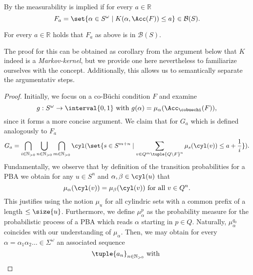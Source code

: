   By \cite[Theorem 9.2]{Bauer} the measurability is implied if for every 
  $a\in\mathbb{R}$ 
  \begin{equation*}
    F_{a} = \set{\alpha\in S^{\omega}\mid 
      K(\alpha, \Acc(F))\leq a}\in\mathcal{B}(S).
  \end{equation*}
  \begin{lemma}
    For every $a\in\mathbb{R}$ holds that $F_{a}$ as above is in 
    $\mathcal{B}(S)$.
  \end{lemma}
  The proof for this can be obtained as corollary from the argument below that 
  $K$ indeed is a \emph{Markov-kernel}, but we provide one here nevertheless to 
  familiarize ourselves with the concept. Additionally, this allows us to 
  semantically separate the argumentativ steps.
  \begin{proof}
    Initially, we focus on a co-Büchi condition $F$ and examine
    \begin{equation*}
      g:S^{\omega}\rightarrow\interval{0,1}\text{ with }
      g(\alpha) = \mu_{\alpha}(\Acc_{\cobuechi}(F)),
    \end{equation*}
    since it forms a more concise argument. We claim that for $G_{a}$ 
    which is defined analogously to $F_{a}$
    \begin{equation}
      G_{a} = \bigcap_{i\in\mathbb{N}_{>0}}\bigcup_{n\in\mathbb{N}_{>0}}
        \bigcap_{m\in\mathbb{N}_{>0}}\cyl(\set{s\in S^{m+n}\mid
        \sum\limits_{v\in Q^{m}\tuple{Q\setminus F}^{n}}\mu_{s}(\cyl(v))\leq 
          a+\frac{1}{i}}).
      \label{eq:Ga}
    \end{equation}
    Fundamentally, we observe that by definition of the transition 
    probabilities for a \ac{PBA} we obtain for any $u\in S^{n}$ and 
    $\alpha, \beta\in\cyl(u)$ that
    \begin{equation}
      \mu_{\alpha}(\cyl(v)) = \mu_{\beta}(\cyl(v))\text{ for all }v\in Q^{n}.
    \end{equation}
    This justifies using the notion $\mu_{u}$ for all cylindric sets with a
    common prefix of a length $\leq\size{u}$. Furthermore, we define 
    $\mu^{p}_{\alpha}$ as the probability measure for the probabilistic process 
    of a \ac{PBA} which reads $\alpha$ starting in $p\in Q$. Naturally, 
    $\mu^{q_{0}}_{\alpha}$ coincides with our understanding of $\mu_{\alpha}$. 
    Then, we may obtain for every 
    $\alpha = \alpha_{1}\alpha_{2}\dots\in\Sigma^{\omega}$ an associated 
    sequence
    \begin{equation*}
      \tuple{a_{n}}_{n\in\mathbb{N}_{>0}}\text{ with }

\end{equation*}
\end{proof}
